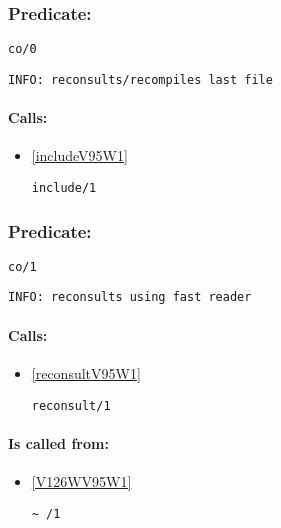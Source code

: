 \subsubsection{Predicate:} \label{coV95W0}

\begin{verbatim}
co/0
\end{verbatim}

{\small \begin{verbatim}
INFO: reconsults/recompiles last file

\end{verbatim}}
\paragraph{Calls:} 
\begin{itemize}
\item \ref{includeV95W1} 
\begin{verbatim}
include/1
\end{verbatim}

\end{itemize}

\subsubsection{Predicate:} \label{coV95W1}

\begin{verbatim}
co/1
\end{verbatim}

{\small \begin{verbatim}
INFO: reconsults using fast reader

\end{verbatim}}
\paragraph{Calls:} 
\begin{itemize}
\item \ref{reconsultV95W1} 
\begin{verbatim}
reconsult/1
\end{verbatim}

\end{itemize}
\paragraph{Is called from:} 
\begin{itemize}
\item \ref{V126WV95W1} 
\begin{verbatim}
~ /1
\end{verbatim}

\end{itemize}

